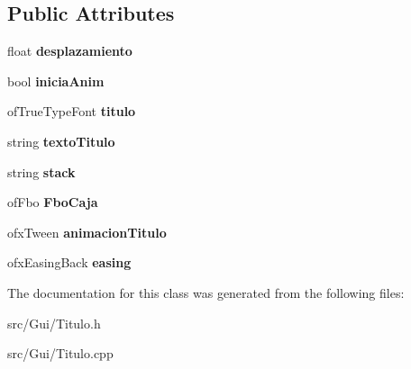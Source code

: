 \subsection*{Public Attributes}
\begin{DoxyCompactItemize}
\item 
\hypertarget{class_titulo_a11ed363267671e800063299568ecc9e9}{}float {\bfseries desplazamiento}\label{class_titulo_a11ed363267671e800063299568ecc9e9}

\item 
\hypertarget{class_titulo_aaa194e5e72a1242058dfdcee86a0f6ef}{}bool {\bfseries inicia\+Anim}\label{class_titulo_aaa194e5e72a1242058dfdcee86a0f6ef}

\item 
\hypertarget{class_titulo_a00c81b1c73caa62cf9ac9b0ea7da1247}{}of\+True\+Type\+Font {\bfseries titulo}\label{class_titulo_a00c81b1c73caa62cf9ac9b0ea7da1247}

\item 
\hypertarget{class_titulo_a5abfcc1d2c4831305cced64593c9b339}{}string {\bfseries texto\+Titulo}\label{class_titulo_a5abfcc1d2c4831305cced64593c9b339}

\item 
\hypertarget{class_titulo_a49b321e3499b0013a7767f5e94493e26}{}string {\bfseries stack}\label{class_titulo_a49b321e3499b0013a7767f5e94493e26}

\item 
\hypertarget{class_titulo_a11953b36202597438f89287ded91f4d5}{}of\+Fbo {\bfseries Fbo\+Caja}\label{class_titulo_a11953b36202597438f89287ded91f4d5}

\item 
\hypertarget{class_titulo_a739731c069e3143f35eac3e103f00f58}{}ofx\+Tween {\bfseries animacion\+Titulo}\label{class_titulo_a739731c069e3143f35eac3e103f00f58}

\item 
\hypertarget{class_titulo_a703efa8ca1c9d6a0b13072f803c5ec44}{}ofx\+Easing\+Back {\bfseries easing}\label{class_titulo_a703efa8ca1c9d6a0b13072f803c5ec44}

\end{DoxyCompactItemize}


The documentation for this class was generated from the following files\+:\begin{DoxyCompactItemize}
\item 
src/\+Gui/Titulo.\+h\item 
src/\+Gui/Titulo.\+cpp\end{DoxyCompactItemize}
